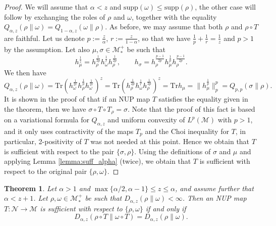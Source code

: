 \documentclass[12pt]{article}
\def\Ne{\mathcal N}
\def\Me{\mathcal M}
\def\Tr{\mathrm{Tr}}
\def\supp{\mathrm{supp}}
\newtheorem{theorem}{Theorem}
\theoremstyle{definition}
\theoremstyle{remark}
\begin{document}
\begin{proof} We will  assume that $\alpha < z$  and $\supp(\omega) \le \supp(\rho)$, the
other case will follow by exchanging the roles of $\rho$ and $\omega$, together with the
equality ${Q}_{\alpha,z}(\rho\|\omega)={Q}_{1-\alpha,z}(\omega\|\rho)$. %
As before, we may
assume that both $\rho$ and $\rho\circ T$ are faithful. Let us denote
$p:=\frac{z}{\alpha}$, $r:=\frac{z}{1-\alpha}$, so that we have $\frac1p+\frac1r=\frac1z$
and $p>1$ by the assumption. Let also $\mu,\sigma\in \Me_*^+$ be such that 
\[
h_\mu^{\frac1z}=h_\rho^{\frac1{2p}}h_\omega^{\frac1r}h_\rho^{\frac1{2p}},\qquad h_\sigma=
h_\rho^{\frac{p-1}{2p}}h_\mu^{\frac1p}h_\rho^{\frac{p-1}{2p}}.
\]
We then have
\[
Q_{\alpha,z}(\rho\|\omega)=\Tr\left(
h_\omega^{\frac1{2r}}h_\rho^{\frac1p}h_\omega^{\frac1{2r}}\right)^z=\Tr
\left(h_{\rho}^{\frac1{2p}}h_\omega^{\frac1r}h_\rho^{\frac1{2p}}\right)^z=\Tr
h_\mu=\|h_\mu^{\frac1p}\|_p^p=Q_{p,p}(\sigma\|\rho).
\]
It is shown in the proof of \cite[Thm.~4.5]{hiai2024alphaz} that if an NUP map $T$
satisfies the equality given in the theorem, then we have $\sigma\circ T\circ T_\rho=\sigma$. Note that
the proof of this fact is based on a variational formula for $Q_{\alpha,z}$ and uniform convexity
of  $L^p(\Me)$ with $p>1$, and it only uses contractivity of the maps $T_p$ and the Choi
inequality for $T$, in particular, 2-positivity of $T$ was not needed at this point.  
Hence we obtain that $T$ is sufficient with respect to the pair $\{\sigma,\rho\}$. Using
the definitions of $\sigma$ and $\mu$ and applying Lemma \ref{lemma:suff_alpha} (twice),
we obtain that $T$ is sufficient with respect to the original pair $\{\rho,\omega\}$. 


\end{proof}


\begin{theorem}\label{thm:alphagr} Let $\alpha > 1$ and $\max\{\alpha/2, \alpha - 1\} \le
z\le \alpha$, and assume further that $\alpha < z + 1$. Let  $\rho,\omega \in \Me_*^+$
be such that $D_{\alpha,z} (\rho\|\omega) < \infty$. 
Then an NUP map $T : \Ne \to  \Me$  is sufficient  with
respect to $\{\rho, \omega\}$ if and only if
\[
D_{\alpha,z} (\rho \circ T\|\omega \circ T) = D_{\alpha,z} (\rho\|\omega). 
\]


\end{theorem}
\end{document}
